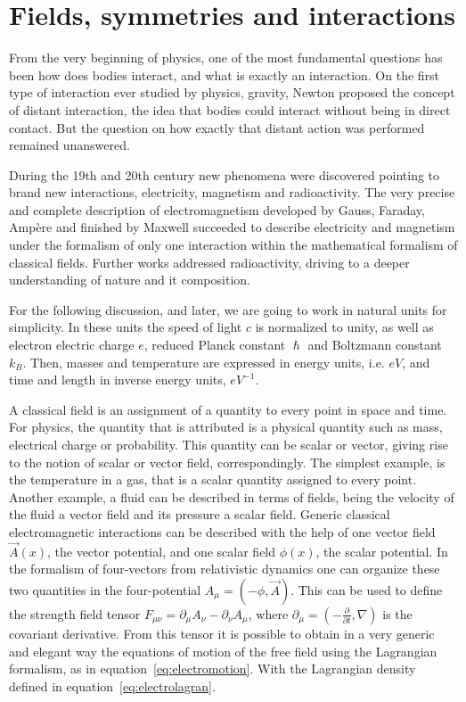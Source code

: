 \section{Fields, symmetries and interactions}
\label{sec:symm}

From the very beginning of physics, one of the most fundamental questions has been how does bodies interact, and what is exactly an interaction. On the first type of interaction ever studied by physics, gravity, Newton proposed the concept of distant interaction, the idea that bodies could interact without being in direct contact. But the question on how exactly that distant action was performed remained unanswered. 

During the 19th and 20th century new phenomena were discovered pointing to brand new interactions, electricity, magnetism and radioactivity. The very precise and complete description of electromagnetism developed by Gauss, Faraday, Amp\`{e}re and finished by Maxwell succeeded to describe electricity and magnetism under the formalism of only one interaction within the mathematical formalism of classical fields. Further works addressed radioactivity, driving to a deeper understanding of nature and it composition.

For the following discussion, and later, we are going to work in natural units for simplicity. In these units the speed of light $c$ is normalized to unity, as well as electron electric charge $e$, reduced Planck constant $\hslash$ and Boltzmann constant $k_{B}$. Then, masses and temperature are expressed in energy units, i.e. $eV$, and time and length in inverse energy units, $eV^{-1}$.

A classical field is an assignment of a quantity to every point in space and time. For physics, the quantity that is attributed is a physical quantity such as mass, electrical charge or probability. This quantity can be scalar or vector, giving rise to the notion of scalar or vector field, correspondingly. The simplest example, is the temperature in a gas, that is a scalar quantity assigned to every point. Another example, a fluid can be described in terms of fields, being the velocity of the fluid a vector field and its pressure a scalar field. Generic classical electromagnetic interactions can be described with the help of one vector field $\vec{A}(x)$, the vector potential, and one scalar field $\phi(x)$, the scalar potential. In the formalism of four-vectors from relativistic dynamics one can organize these two quantities in the four-potential $A_{\mu}=(-\phi,\vec{A})$. This can be used to define the strength field tensor $F_{\mu\nu}=\partial_{\mu}A_{\nu}-\partial_{\nu}A_{\mu}$, where $\partial_{\mu}=\left( -\frac{\partial}{\partial t},\nabla\right)$ is the covariant derivative. From this tensor it is possible to obtain in a very generic and elegant way the equations of motion of the free field using the Lagrangian formalism, as in equation~\ref{eq:electromotion}. With the Lagrangian density defined in equation~\ref{eq:electrolagran}.


